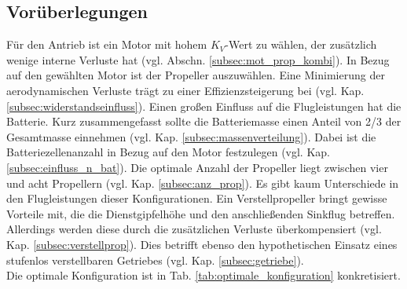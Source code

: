 \subsection{Vorüberlegungen}
\label{subsec:vorueberlegung}
Für den Antrieb ist ein Motor mit hohem \ensuremath{K_V}-Wert zu wählen, der zusätzlich wenige interne Verluste hat (vgl. Abschn. \ref{subsec:mot_prop_kombi}). In Bezug auf den gewählten Motor ist der Propeller auszuwählen. Eine Minimierung der aerodynamischen Verluste trägt zu einer Effizienzsteigerung bei (vgl. Kap. \ref{subsec:widerstandseinfluss}). Einen großen Einfluss auf die Flugleistungen hat die Batterie. Kurz zusammengefasst sollte die Batteriemasse einen Anteil von 2/3 der Gesamtmasse einnehmen (vgl. Kap. \ref{subsec:massenverteilung}). Dabei ist die Batteriezellenanzahl in Bezug auf den Motor festzulegen (vgl. Kap. \ref{subsec:einfluss_n_bat}).
Die optimale Anzahl der Propeller liegt zwischen vier und acht Propellern (vgl. Kap. \ref{subsec:anz_prop}). Es gibt kaum Unterschiede in den Flugleistungen dieser Konfigurationen. Ein Verstellpropeller bringt gewisse Vorteile mit, die die Dienstgipfelhöhe und den anschließenden Sinkflug betreffen. Allerdings werden diese durch die zusätzlichen Verluste überkompensiert (vgl. Kap. \ref{subsec:verstellprop}). Dies betrifft ebenso den hypothetischen Einsatz eines stufenlos verstellbaren Getriebes (vgl. Kap. \ref{subsec:getriebe}). \\
Die optimale Konfiguration ist in Tab. \ref{tab:optimale_konfiguration} konkretisiert.

